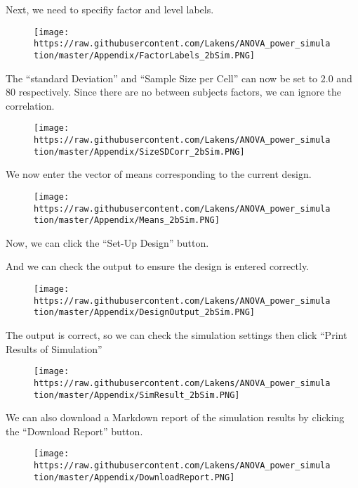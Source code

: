 \documentclass[]{article}
\begin{document}
Next, we need to specifiy factor and level labels.

\begin{figure}
\centering
\texttt{[image: https://raw.githubusercontent.com/Lakens/ANOVA\_power\_simulation/master/Appendix/FactorLabels\_2bSim.PNG]}
\caption{}
\end{figure}

The ``standard Deviation'' and ``Sample Size per Cell'' can now be set
to 2.0 and 80 respectively. Since there are no between subjects factors,
we can ignore the correlation.

\begin{figure}
\centering
\texttt{[image: https://raw.githubusercontent.com/Lakens/ANOVA\_power\_simulation/master/Appendix/SizeSDCorr\_2bSim.PNG]}
\caption{}
\end{figure}

We now enter the vector of means corresponding to the current design.

\begin{figure}
\centering
\texttt{[image: https://raw.githubusercontent.com/Lakens/ANOVA\_power\_simulation/master/Appendix/Means\_2bSim.PNG]}
\caption{}
\end{figure}

Now, we can click the ``Set-Up Design'' button.

And we can check the output to ensure the design is entered correctly.

\begin{figure}
\centering
\texttt{[image: https://raw.githubusercontent.com/Lakens/ANOVA\_power\_simulation/master/Appendix/DesignOutput\_2bSim.PNG]}
\caption{}
\end{figure}

The output is correct, so we can check the simulation settings then
click ``Print Results of Simulation''

\begin{figure}
\centering
\texttt{[image: https://raw.githubusercontent.com/Lakens/ANOVA\_power\_simulation/master/Appendix/SimResult\_2bSim.PNG]}
\caption{}
\end{figure}

We can also download a Markdown report of the simulation results by
clicking the ``Download Report'' button.

\begin{figure}
\centering
\texttt{[image: https://raw.githubusercontent.com/Lakens/ANOVA\_power\_simulation/master/Appendix/DownloadReport.PNG]}
\caption{}
\end{figure}
\end{document}
